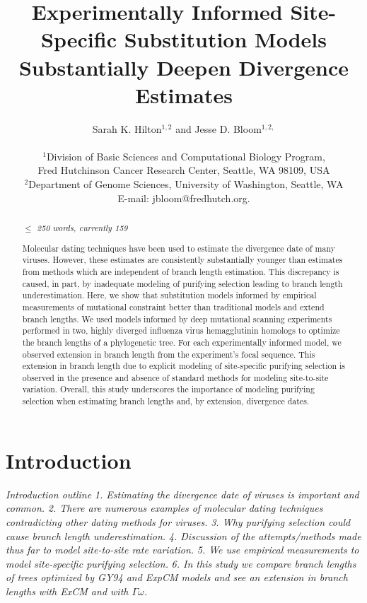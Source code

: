 \documentclass[11pt]{article}
\title{Experimentally Informed Site-Specific Substitution Models Substantially Deepen Divergence Estimates}
\author
{Sarah K. Hilton$^{1,2}$  and Jesse D. Bloom$^{1,2,}$\\
\\
\normalsize{$^1$Division of Basic Sciences and Computational Biology Program,}\\
\normalsize{Fred Hutchinson Cancer Research Center, Seattle, WA 98109, USA}\\
\normalsize{$^2$Department of Genome Sciences, University of Washington, Seattle, WA}\\
\normalsize{E-mail:  jbloom@fredhutch.org.}\\
}
\date{}
\begin{document}
 




\maketitle 


\begin{abstract}
\textit{$\leq$ 250 words, currently 159}   

Molecular dating techniques have been used to estimate the divergence date of many viruses. 
However, these estimates are consistently substantially younger than estimates from methods which are independent of branch length estimation. 
This discrepancy is caused, in part, by inadequate modeling of purifying selection leading to branch length underestimation. 
Here, we show that substitution models informed by empirical measurements of mutational constraint better than traditional models and extend branch lengths. 
We used models informed by deep mutational scanning experiments performed in two, highly diverged influenza virus hemagglutinin homologs to optimize the branch lengths of a phylogenetic tree. 
For each experimentally informed model, we observed extension in branch length from the experiment's focal sequence. 
This extension in branch length due to explicit modeling of site-specific purifying selection is observed in the presence and absence of standard methods for modeling site-to-site variation. 
Overall, this study underscores the importance of modeling purifying selection when estimating branch lengths and, by extension, divergence dates. 

\end{abstract}

\clearpage

\section*{Introduction} 

\textit{Introduction outline}    
\textit{1. Estimating the divergence date of viruses is important and common.}  
\textit{2. There are numerous examples of molecular dating techniques contradicting other dating methods for viruses.}  
\textit{3. Why purifying selection could cause branch length underestimation.}  
\textit{4. Discussion of the attempts/methods made thus far to model site-to-site rate variation.}  
\textit{5. We use empirical measurements to model site-specific purifying selection. }  
\textit{6. In this study we compare branch lengths of trees optimized by GY94 and ExpCM models and see an extension in branch lengths with ExCM and with $\Gamma\omega$. }  
\end{document}
